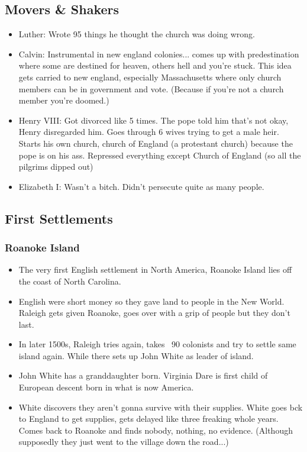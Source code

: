 \documentclass{article}
\begin{document}
    \subsection{Movers \& Shakers}
      \begin{itemize}
        \item Luther: Wrote 95 things he thought the church was doing wrong.
        \item Calvin: Instrumental in new england colonies... comes up with predestination where some are destined for heaven, others hell and you're stuck. This idea gets carried to new england, especially Massachusetts where only church members can be in government and vote. (Because if you're not a church member you're doomed.)
        \item Henry VIII: Got divorced like 5 times. The pope told him that's not okay, Henry disregarded him. Goes through 6 wives trying to get a male heir. Starts his own church, church of England (a protestant church) because the pope is on his ass. Repressed everything except Church of England (so all the pilgrims dipped out)
        \item Elizabeth I: Wasn't a bitch. Didn't persecute quite as many people. 
      \end{itemize}

    

    \subsection{First Settlements}
      \subsubsection{Roanoke Island}
        \begin{itemize}
          \item The very first English settlement in North America, Roanoke Island lies off the coast of North Carolina.
          \item English were short money so they gave land to people in the New World. Raleigh gets given Roanoke, goes over with a grip of people but they don't last.
          \item In later 1500s, Raleigh tries again, takes ~90 colonists and try to settle same island again. While there sets up John White as leader of island. 
          \item John White has a granddaughter born. Virginia Dare is first child of European descent born in what is now America.
          \item White discovers they aren't gonna survive with their supplies. White goes bck to England to get supplies, gets delayed like three freaking whole years. Comes back to Roanoke and finds nobody, nothing, no evidence. (Although supposedly they just went to the village down the road...)
        \end{itemize}
\end{document}

